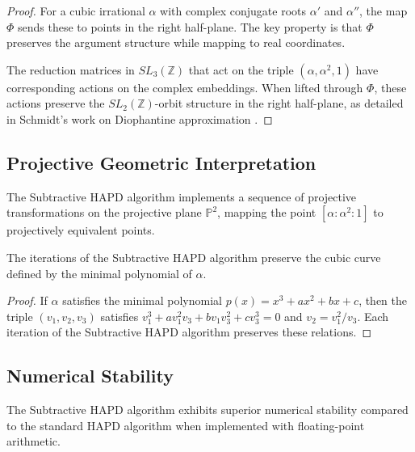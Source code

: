 \begin{proof}
For a cubic irrational $\alpha$ with complex conjugate roots $\alpha'$ and $\alpha''$, the map $\Phi$ sends these to points in the right half-plane. The key property is that $\Phi$ preserves the argument structure while mapping to real coordinates.

The reduction matrices in $SL_3(\mathbb{Z})$ that act on the triple $(\alpha, \alpha^2, 1)$ have corresponding actions on the complex embeddings. When lifted through $\Phi$, these actions preserve the $SL_2(\mathbb{Z})$-orbit structure in the right half-plane, as detailed in Schmidt's work on Diophantine approximation \cite{Schmidt70}.
\end{proof}

\subsection{Projective Geometric Interpretation}

\begin{proposition}\label{prop:geometric_action}
The Subtractive HAPD algorithm implements a sequence of projective transformations on the projective plane $\mathbb{P}^2$, mapping the point $[\alpha:\alpha^2:1]$ to projectively equivalent points.
\end{proposition}

\begin{theorem}\label{thm:invariant_curves}
The iterations of the Subtractive HAPD algorithm preserve the cubic curve defined by the minimal polynomial of $\alpha$.
\end{theorem}

\begin{proof}
If $\alpha$ satisfies the minimal polynomial $p(x) = x^3 + ax^2 + bx + c$, then the triple $(v_1, v_2, v_3)$ satisfies $v_1^3 + av_1^2v_3 + bv_1v_3^2 + cv_3^3 = 0$ and $v_2 = v_1^2/v_3$. Each iteration of the Subtractive HAPD algorithm preserves these relations.
\end{proof}

\subsection{Numerical Stability}

\begin{proposition}\label{prop:numerical_stability}
The Subtractive HAPD algorithm exhibits superior numerical stability compared to the standard HAPD algorithm when implemented with floating-point arithmetic.
\end{proposition}

